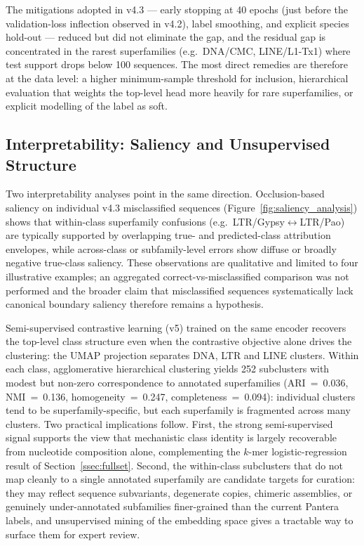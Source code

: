 \documentclass[12pt]{article}
\begin{document}
The mitigations adopted in v4.3 --- early stopping at 40 epochs (just before the validation-loss inflection observed in v4.2), label smoothing, and explicit species hold-out --- reduced but did not eliminate the gap, and the residual gap is concentrated in the rarest superfamilies (e.g.\ DNA/CMC, LINE/L1-Tx1) where test support drops below 100 sequences. The most direct remedies are therefore at the data level: a higher minimum-sample threshold for inclusion, hierarchical evaluation that weights the top-level head more heavily for rare superfamilies, or explicit modelling of the label as soft.

\subsection{Interpretability: Saliency and Unsupervised Structure}

Two interpretability analyses point in the same direction. Occlusion-based saliency on individual v4.3 misclassified sequences (Figure~\ref{fig:saliency_analysis}) shows that within-class superfamily confusions (e.g.\ LTR/Gypsy$\leftrightarrow$LTR/Pao) are typically supported by overlapping true- and predicted-class attribution envelopes, while across-class or subfamily-level errors show diffuse or broadly negative true-class saliency. These observations are qualitative and limited to four illustrative examples; an aggregated correct-vs-misclassified comparison was not performed and the broader claim that misclassified sequences systematically lack canonical boundary saliency therefore remains a hypothesis.

Semi-supervised contrastive learning (v5) trained on the same encoder recovers the top-level class structure even when the contrastive objective alone drives the clustering: the UMAP projection separates DNA, LTR and LINE clusters. Within each class, agglomerative hierarchical clustering yields 252 subclusters with modest but non-zero correspondence to annotated superfamilies (ARI~=~0.036, NMI~=~0.136, homogeneity~=~0.247, completeness~=~0.094): individual clusters tend to be superfamily-specific, but each superfamily is fragmented across many clusters. Two practical implications follow. First, the strong semi-supervised signal supports the view that mechanistic class identity is largely recoverable from nucleotide composition alone, complementing the $k$-mer logistic-regression result of Section~\ref{ssec:fullset}. Second, the within-class subclusters that do not map cleanly to a single annotated superfamily are candidate targets for curation: they may reflect sequence subvariants, degenerate copies, chimeric assemblies, or genuinely under-annotated subfamilies finer-grained than the current Pantera labels, and unsupervised mining of the embedding space gives a tractable way to surface them for expert review.
\end{document}
